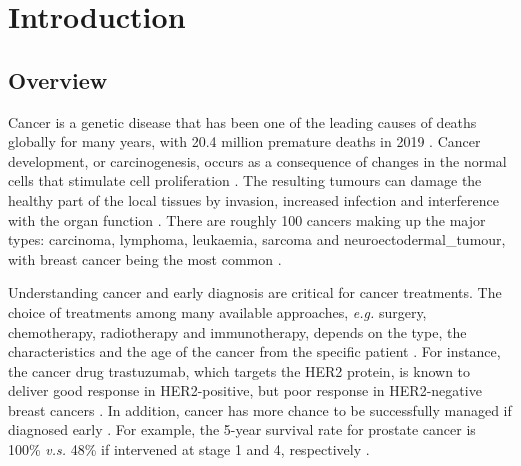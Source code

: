 \chapter{Introduction}\label{intro}

\section{Overview}

Cancer is a genetic disease that has been one of the leading causes of deaths globally for many years, with 20.4 million premature deaths in 2019 \citep{Bray2021TheWorldwide}. Cancer development, or carcinogenesis, occurs as a consequence of changes in the normal cells that stimulate cell proliferation \citep{Weinberg1996HowArises}. The resulting tumours can damage the healthy part of the local tissues by invasion, increased infection and interference with the organ function \citep{Tobias2014CancerManagement}. There are roughly 100 cancers making up the major types: \gls{carcinoma}, \gls{lymphoma}, \gls{leukaemia}, \gls{sarcoma} and \gls{neuroectodermal_tumour}, with breast cancer being the most common \citep{Tobias2014CancerManagement, NationalCancerInstitute2021CommonInstitute}. 

Understanding cancer and early diagnosis are critical for cancer treatments. The choice of treatments among many available approaches, \textit{e.g.} surgery, chemotherapy, radiotherapy and immunotherapy, depends on the type, the characteristics and the age of the cancer from the specific patient \citep{Tobias2014CancerManagement}. For instance, the cancer drug trastuzumab, which targets the HER2 protein, is known to deliver good response in HER2-positive, but poor response in HER2-negative breast cancers \citep{Kreutzfeldt2020TheTherapies}. In addition, cancer has more chance to be successfully managed if diagnosed early \citep{Hawkes2019CancerDiagnosis}. For example, the 5-year survival rate for prostate cancer is 100\% \textit{v.s.} 48\% if intervened at stage 1 and 4, respectively \citep{Hawkes2019CancerDiagnosis}. 

